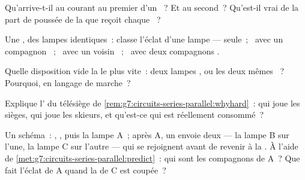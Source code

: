 \begin{exercise}[$\star$]\label{exo:g7:circuits-series-parallel:5}
Qu'arrive-t-il au courant au premier  d'un ~? Et au second~? Qu'est-il vrai de la part de poussée de
la  que reçoit chaque ~?
\end{exercise}

\begin{exercise}[$\star$]\label{exo:g7:circuits-series-parallel:6}
Une , des lampes identiques~: classe l'éclat d'une lampe ---
seule~; \ avec un compagnon ~; \ avec un voisin ~; \ avec deux compagnons .
\end{exercise}

\begin{exercise}[$\star$]\label{exo:g7:circuits-series-parallel:7}
Quelle disposition vide la  le plus vite~: deux lampes ,
ou les deux mêmes ~? Pourquoi, en langage de marche~?
\end{exercise}

\begin{exercise}[$\star$]\label{exo:g7:circuits-series-parallel:8}
Explique l' du télésiège de
\cref{rem:g7:circuits-series-parallel:whyhard}~: qui joue les
sièges, qui joue les skieurs, et qu'est-ce qui est réellement
consommé~?
\end{exercise}

\begin{exercise}[$\star\star$]\label{exo:g7:circuits-series-parallel:9}
Un schéma~: , , puis la lampe A~; après A, un 
envoie deux  --- la lampe B sur l'une, la lampe C sur
l'autre --- qui se rejoignent avant de revenir à la . À l'aide de
\cref{met:g7:circuits-series-parallel:predict}~: qui sont les
compagnons  de A~? Que fait l'éclat de A quand la  de
C est coupée~?
\end{exercise}

